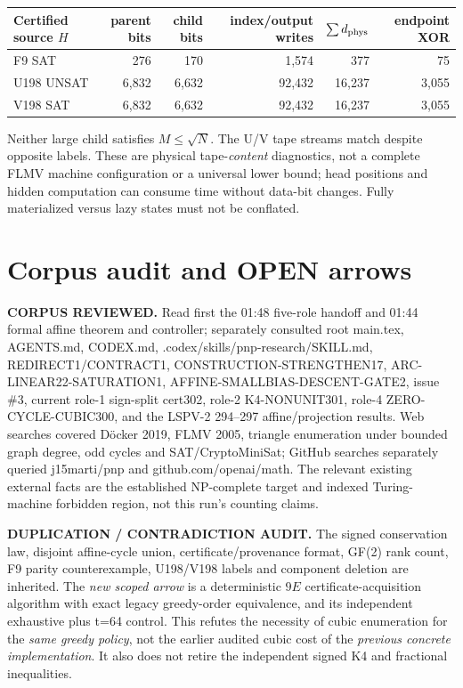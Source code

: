 \documentclass[11pt]{article}
\begin{document}
\begin{center}\begin{tabular}{lrrrrr}\toprule
Certified source $H$ & parent bits & child bits & index/output writes & $\sum d_{\rm phys}$ & endpoint XOR\\\midrule
F9 SAT &276&170&1,574&377&75\\
U198 UNSAT &6,832&6,632&92,432&16,237&3,055\\
V198 SAT &6,832&6,632&92,432&16,237&3,055\\\bottomrule\end{tabular}\end{center}
Neither large child satisfies $M\le\sqrt{N}$. The U/V tape streams match despite opposite labels. These are physical tape-\emph{content} diagnostics, not a complete FLMV machine configuration or a universal lower bound; head positions and hidden computation can consume time without data-bit changes. Fully materialized versus lazy states must not be conflated.

\section{Corpus audit and OPEN arrows}
\noindent\textbf{CORPUS REVIEWED.} Read first the 01:48 five-role handoff and 01:44 formal affine theorem and controller; separately consulted root main.tex, AGENTS.md, CODEX.md, .codex/skills/pnp-research/SKILL.md, REDIRECT1/CONTRACT1, CONSTRUCTION-STRENGTHEN17, ARC-LINEAR22-SATURATION1, AFFINE-SMALLBIAS-DESCENT-GATE2, issue \#3, current role-1 sign-split cert302, role-2 K4-NONUNIT301, role-4 ZERO-CYCLE-CUBIC300, and the LSPV-2 294--297 affine/projection results. Web searches covered D\"ocker 2019, FLMV 2005, triangle enumeration under bounded graph degree, odd cycles and SAT/CryptoMiniSat; GitHub searches separately queried j15marti/pnp and github.com/openai/math. The relevant existing external facts are the established NP-complete target and indexed Turing-machine forbidden region, not this run's counting claims.

\noindent\textbf{DUPLICATION / CONTRADICTION AUDIT.} The signed conservation law, disjoint affine-cycle union, certificate/provenance format, GF(2) rank count, F9 parity counterexample, U198/V198 labels and component deletion are inherited. The \emph{new scoped arrow} is a deterministic $9E$ certificate-acquisition algorithm with exact legacy greedy-order equivalence, and its independent exhaustive plus t=64 control. This refutes the necessity of cubic enumeration for the \emph{same greedy policy}, not the earlier audited cubic cost of the \emph{previous concrete implementation}. It also does not retire the independent signed K4 and fractional inequalities.
\end{document}
